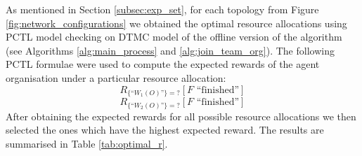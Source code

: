 \documentclass{llncs}
\begin{document}
\begin{table}
\centering
{}

\caption{Model comparison for different number of agents in a fully connected agent organisation and different models for offline version of the Algorithm \ref{alg:main_process}.}
\label{tab:model_sizes}
\end{table}

As mentioned in Section \ref{subsec:exp_set}, for each topology from Figure \ref{fig:network_configurations} we obtained the optimal resource allocations using PCTL model checking on DTMC model of the offline version of the algorithm (see Algorithms \ref{alg:main_process} and \ref{alg:join_team_org}). The following PCTL formulae were used to compute the expected rewards of the agent organisation under a particular resource allocation:
\[
R_{\{\mbox{``$W_1(O)$''}\}=?} [F \mbox{ ``finished''}]
\]
\[
R_{\{\mbox{``$W_2(O)$''}\}=?} [F \mbox{ ``finished''}]
\]
After obtaining the expected rewards for all possible resource allocations we then selected the ones which have the highest expected reward. The results are summarised in Table \ref{tab:optimal_r}.
\end{document}
